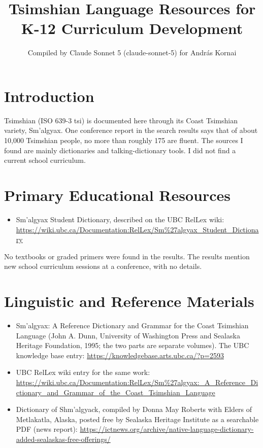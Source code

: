 \documentclass[12pt]{article}
\title{Tsimshian Language Resources for K-12 Curriculum Development}
\author{Compiled by Claude Sonnet 5 (claude-sonnet-5) for Andr\'as Kornai}
\date{}
\begin{document}
\maketitle

\section{Introduction}
Tsimshian (ISO 639-3 tsi) is documented here through its Coast Tsimshian variety, Sm'algyax. One conference report in the search results says that of about 10,000 Tsimshian people, no more than roughly 175 are fluent. The sources I found are mainly dictionaries and talking-dictionary tools. I did not find a current school curriculum.

\section{Primary Educational Resources}
\begin{itemize}
\item Sm'algyax Student Dictionary, described on the UBC RelLex wiki: \url{https://wiki.ubc.ca/Documentation:RelLex/Sm%27algyax_Student_Dictionary}
\end{itemize}
No textbooks or graded primers were found in the results. The results mention new school curriculum sessions at a conference, with no details.

\section{Linguistic and Reference Materials}
\begin{itemize}
\item Sm'algyax: A Reference Dictionary and Grammar for the Coast Tsimshian Language (John A. Dunn, University of Washington Press and Sealaska Heritage Foundation, 1995; the two parts are separate volumes). The UBC knowledge base entry: \url{https://knowledgebase.arts.ubc.ca/?p=2593}
\item UBC RelLex wiki entry for the same work: \url{https://wiki.ubc.ca/Documentation:RelLex/Sm%27algyax:_A_Reference_Dictionary_and_Grammar_of_the_Coast_Tsimshian_Language}
\item Dictionary of Shm'algyack, compiled by Donna May Roberts with Elders of Metlakatla, Alaska, posted free by Sealaska Heritage Institute as a searchable PDF (news report): \url{https://ictnews.org/archive/native-language-dictionary-added-sealaskas-free-offerings/}
\end{itemize}
\end{document}
